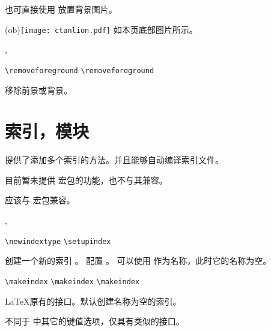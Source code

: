 \documentclass{cusdoc}
\begin{document}
也可直接使用  放置背景图片。
\begin{xample}
\background(ob){\texttt{[image: ctanlion.pdf]}}
\stopxamplecode
\xampleprint
如本页底部图片所示。
\end{xample}


\begin{function}{\removeforeground,\removebackground}
  \begin{syntax}
    \verb|\removeforeground|
    \verb|\removeforeground| 
  \end{syntax}
移除前景或背景。
\end{function}


\section{索引，模块}

\CusTeX 提供了添加多个索引的方法。并且能够自动编译索引文件。

目前暂未提供  宏包的功能，也不与其兼容。

应该与  宏包兼容。

\begin{function}{\newindextype,\setupindex}
  \begin{syntax}
    \verb|\newindextype|  
    \verb|\setupindex|    
  \end{syntax}
 创建一个新的索引 。
 配置 。
 可以使用  作为名称，此时它的名称为空。
\end{function}

\begin{function}{\makeindex}
  \begin{syntax}
    \verb|\makeindex|
    \verb|\makeindex| 
    \verb|\makeindex|  
  \end{syntax}
\LaTeX 原有的接口。默认创建名称为空的索引。
\end{function}

 不同于 \CusTeX 中其它的键值选项，仅具有类似的接口。
\end{document}
